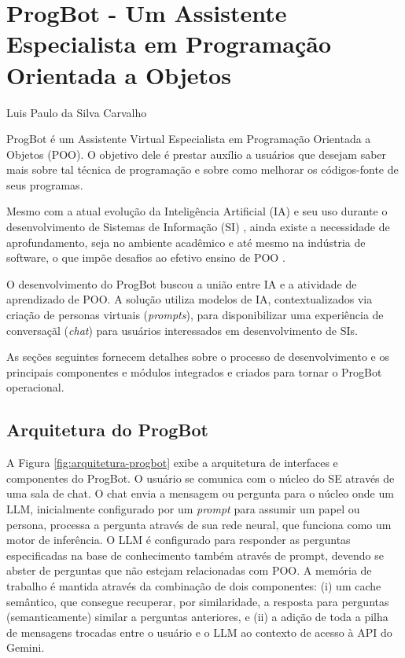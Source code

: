 \chapter{ProgBot - Um Assistente Especialista em Programação Orientada a Objetos}

\begin{flushright}
Luis Paulo da Silva Carvalho
\end{flushright}

ProgBot é um Assistente Virtual Especialista em Programação Orientada a Objetos (POO). O objetivo dele é prestar auxílio a usuários que desejam saber mais sobre tal técnica de programação e sobre como melhorar os códigos-fonte de seus programas.

Mesmo com a atual evolução da Inteligência Artificial (IA) e seu uso durante o desenvolvimento de Sistemas de Informação (SI) \cite{yamada2026impactos}, ainda existe a necessidade de aprofundamento, seja no ambiente acadêmico e até mesmo na indústria de software, o que impõe desafios ao efetivo ensino de POO \cite{sperotto2025metodologias}. 

O desenvolvimento do ProgBot buscou a união entre IA e a atividade de aprendizado de POO. A solução utiliza modelos de IA, contextualizados via criação de personas virtuais (\textit{prompts}), para disponibilizar uma experiência de conversaçãl (\textit{chat}) para usuários interessados em desenvolvimento de SIs.

As seções seguintes fornecem detalhes sobre o processo de desenvolvimento e os principais componentes e módulos integrados e criados para tornar o ProgBot operacional.

\section{Arquitetura do ProgBot}

A Figura \ref{fig:arquitetura-progbot} exibe a arquitetura de interfaces e componentes do ProgBot. O usuário se comunica com o núcleo do SE através de uma sala de chat. O chat envia a mensagem ou pergunta para o núcleo onde um LLM, inicialmente configurado por um \textit{prompt} para assumir um papel ou persona, processa a pergunta através de sua rede neural, que funciona como um motor de inferência. O LLM é configurado para responder as perguntas especificadas na base de conhecimento também através de {prompt}, devendo se abster de perguntas que não estejam relacionadas com POO. A memória de trabalho é mantida através da combinação de dois componentes: (i) um cache semântico, que consegue recuperar, por similaridade, a resposta para perguntas (semanticamente) similar a perguntas anteriores, e (ii) a adição de toda a pilha de mensagens trocadas entre o usuário e o LLM ao contexto de acesso à API do Gemini.

